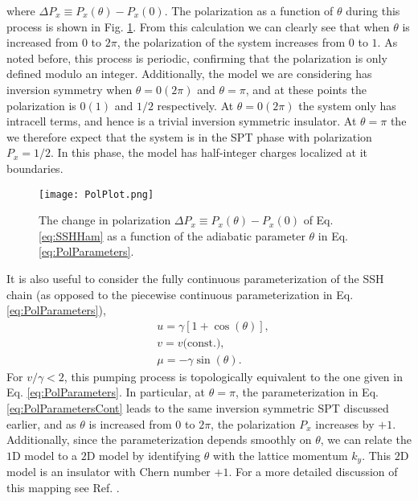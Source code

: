 \documentclass[prb,aps,twocolumn,groupaddress,floatfix]{revtex4-1}
\begin{document}
 where $\Delta P_x \equiv P_x(\theta)-P_x(0)$. The polarization as a function of $\theta$ during this process is shown in Fig. \ref{fig:PolPlot}. From this calculation we can clearly see that when $\theta$ is increased from $0$ to $2\pi$, the polarization of the system increases from $0$ to $1$. As noted before, this process is periodic, confirming that the polarization is only defined modulo an integer. Additionally, the model we are considering has inversion symmetry when $\theta = 0 (2\pi)$ and $\theta = \pi$, and at these points the polarization is $0(1)$ and $1/2$ respectively. At $\theta = 0(2\pi)$ the system only has intracell terms, and hence is a trivial inversion symmetric insulator. At $\theta = \pi$ the we therefore expect that the system is in the SPT phase with polarization $P_x = 1/2$. In this phase, the model has half-integer charges localized at it boundaries. 

\begin{figure}\centering
\texttt{[image: PolPlot.png]}
\caption{The change in polarization  $\Delta P_{x} \equiv P_{x}(\theta)-P_{x}(0)$ of Eq. \ref{eq:SSHHam} as a function of the adiabatic parameter $\theta $ in Eq. \ref{eq:PolParameters}. }\label{fig:PolPlot}
\end{figure}

It is also useful to consider the fully continuous parameterization of the SSH chain (as opposed to the piecewise continuous parameterization  in Eq. \ref{eq:PolParameters}), 
\begin{equation}
\begin{split}
&u = \gamma[1+\cos(\theta)],\\
& v = v\text{(const.)},\\
&\mu = -\gamma \sin(\theta). \label{eq:PolParametersCont}
\end{split}
\end{equation}
For $v/\gamma < 2$, this pumping process is topologically equivalent to the one given in Eq. \ref{eq:PolParameters}. In particular, at $\theta = \pi$, the parameterization in Eq. \ref{eq:PolParametersCont} leads to the same inversion symmetric SPT discussed earlier, and as $\theta$ is increased from $0$ to $2\pi$, the polarization $P_x$ increases by $+1$. Additionally, since the parameterization depends smoothly on $\theta$, we can relate the $1$D model to a $2$D model by identifying $\theta$ with the lattice momentum $k_y$. This $2$D model is an insulator with Chern number $+1$. For a more detailed discussion of this mapping see Ref. . 
\end{document}

